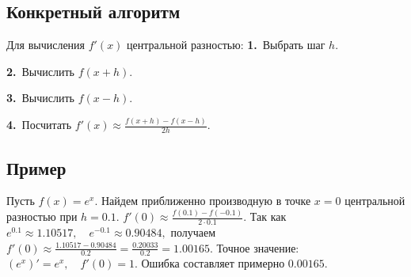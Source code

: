 \documentclass[12pt,a4paper]{article}
\begin{document}
\subsection{Конкретный алгоритм}
Для вычисления $f'(x)$ центральной разностью:
\noindent\textbf{1.}\ Выбрать шаг $h$.\par
\noindent\textbf{2.}\ Вычислить $f(x+h)$.\par
\noindent\textbf{3.}\ Вычислить $f(x-h)$.\par
\noindent\textbf{4.}\ Посчитать $f'(x) \approx \frac{f(x+h)-f(x-h)}{2h}.$\par
\subsection{Пример}
Пусть $f(x)=e^x.$
Найдем приближенно производную в точке $x=0$ центральной разностью при $h=0.1$. $f'(0) \approx \frac{f(0.1)-f(-0.1)}{2\cdot 0.1}.$
Так как $e^{0.1} \approx 1.10517,\quad e^{-0.1} \approx 0.90484,$
получаем $f'(0) \approx \frac{1.10517 - 0.90484}{0.2} = \frac{0.20033}{0.2} = 1.00165.$
Точное значение: $(e^x)' = e^x,\quad f'(0)=1.$
Ошибка составляет примерно $0.00165.$
\end{document}

